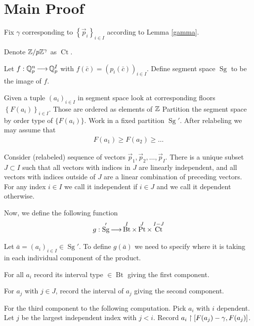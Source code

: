 \documentclass{amsart}
\newcommand{\curly}[1]{\left\{#1\right\}}
\DeclareMathOperator{\Sg}{Sg}
\DeclareMathOperator{\Bt}{Bt}
\DeclareMathOperator{\Pt}{Pt}
\DeclareMathOperator{\Ct}{Ct}
\begin{document}
\section{Main Proof}

Fix $\gamma$ corresponding to $\curly{\vec p_i}_{i \in I}$ according to Lemma \ref{gamma}.

\begin{Definition}
	Denote $\mathbb{Z}/p\mathbb{Z}^\gamma$ as $\Ct$.
\end{Definition}

\begin{Definition}
	Let $f: \mathbb{Q}_p^n \operatorname{\longrightarrow} \mathbb{Q}_p^I$ with $f(\bar c) = (p_i(\bar c))_{i \in I}$.
	Define segment space $\Sg$ to be the image of $f$.	
\end{Definition}


Given a tuple $(a_i)_{i\in I}$ in segment space look at corresponding floors $\curly{F(a_i)}_{i\in I}$.
Those are ordered as elements of $\mathbb{Z}$
Partition the segment space by order type of $\{F(a_i)\}$.
Work in a fixed partition $\Sg'$.
After relabeling we may assume that
\begin{align*}
	F(a_1) \geq F(a_2) \geq \ldots 
\end{align*}

Consider (relabeled) sequence of vectors $\vec p_1, \vec p_2, \ldots, \vec p_I$.
There is a unique subset $J \subset I$ such that all vectors with indices in $J$ are linearly independent, and all vectors with indices outside of $J$ are a linear combination of preceding vectors.
For any index $i \in I$ we call it independent if $i \in J$ and we call it dependent otherwise.

Now, we define the following function
\begin{align*}
	g: \Sg' \arr \Bt^I \times \Pt^J \times \Ct^{I - J}
\end{align*}

Let $\bar a = (a_i)_{i\in I} \in \Sg'$.
To define $g(\bar a)$ we need to specify where it is taking in each individual component of the product.

For all $a_i$ record its interval type $\in \Bt$ giving the first component.

For $a_j$ with $j \in J$, record the interval of $a_j$ giving the second component.

For the third component to the following computation.
Pick $a_i$ with $i$ dependent.
Let $j$ be the largest independent index with $j < i$.
Record $a_i \upharpoonright [F(a_j) - \gamma, F(a_j)]$.
\end{document}
